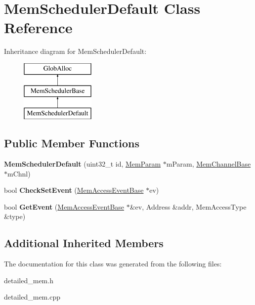 \hypertarget{classMemSchedulerDefault}{\section{Mem\-Scheduler\-Default Class Reference}
\label{classMemSchedulerDefault}
}
Inheritance diagram for Mem\-Scheduler\-Default\-:\begin{figure}[H]
\begin{center}
\leavevmode
\includegraphics[height=3.000000cm]{classMemSchedulerDefault}
\end{center}
\end{figure}
\subsection*{Public Member Functions}
\begin{DoxyCompactItemize}
\item 
\hypertarget{classMemSchedulerDefault_ad41c1712277da576afd22a5054a21fbf}{{\bfseries Mem\-Scheduler\-Default} (uint32\-\_\-t id, \hyperlink{classMemParam}{Mem\-Param} $\ast$m\-Param, \hyperlink{classMemChannelBase}{Mem\-Channel\-Base} $\ast$m\-Chnl)}\label{classMemSchedulerDefault_ad41c1712277da576afd22a5054a21fbf}

\item 
\hypertarget{classMemSchedulerDefault_a0bdabadb1fead281bff9412233fa3697}{bool {\bfseries Check\-Set\-Event} (\hyperlink{classMemAccessEventBase}{Mem\-Access\-Event\-Base} $\ast$ev)}\label{classMemSchedulerDefault_a0bdabadb1fead281bff9412233fa3697}

\item 
\hypertarget{classMemSchedulerDefault_ab522d755027139848c8cdfc2270924f6}{bool {\bfseries Get\-Event} (\hyperlink{classMemAccessEventBase}{Mem\-Access\-Event\-Base} $\ast$\&ev, Address \&addr, Mem\-Access\-Type \&type)}\label{classMemSchedulerDefault_ab522d755027139848c8cdfc2270924f6}

\end{DoxyCompactItemize}
\subsection*{Additional Inherited Members}


The documentation for this class was generated from the following files\-:\begin{DoxyCompactItemize}
\item 
detailed\-\_\-mem.\-h\item 
detailed\-\_\-mem.\-cpp\end{DoxyCompactItemize}

